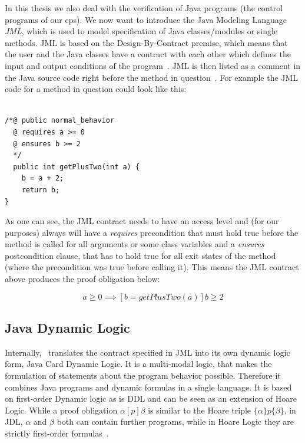 In this thesis we also deal with the verification of Java programs (the control programs of our cps). We now want to introduce the Java Modeling Language \textit{JML}, which is used to model specification of Java classes/modules or single methods. JML is based on the Design-By-Contract premise, which means that the user and the Java classes have a contract with each other which defines the input and output conditions of the program~\cite{keybook2007}. JML is then listed as a comment in the Java source code right before the method in question~\cite{fmcoKeYTutorial06}. For example the JML code for a method in question could look like this:


\begin{lstlisting}[label=lst:jml_example]

/*@ public normal_behavior
  @ requires a >= 0
  @ ensures b >= 2
  */
  public int getPlusTwo(int a) {
  	b = a + 2;
  	return b;
}

\end{lstlisting}

As one can see, the JML contract needs to have an access level and (for our purposes) always will have a \textit{requires} precondition that must hold true before the method is called for all arguments or some class variables and a \textit{ensures} postcondition clause, that has to hold true for all exit states of the method (where the precondition was true before calling it). This means the JML contract above produces the proof obligation below:

\begin{equation}
	a \geq 0 \implies [b = getPlusTwo(a) ] b \geq 2
	\label{eq:jmlddl}
\end{equation}

\subsection{Java Dynamic Logic}
\label{subsec:jdl}

Internally, \key~translates the contract specified in JML into its own dynamic logic form, Java Card Dynamic Logic. It is a multi-modal logic, that makes the formulation of statements about the program behavior possible. Therefore it combines Java programs and dynamic formulas in a single language. It is based on first-order Dynamic logic as is DDL and can be seen as an extension of Hoare Logic. While a proof obligation \(\alpha[p]\beta\) is similar to the Hoare triple \(\{\alpha\}p\{\beta\}\), in JDL, \(\alpha\) and \(\beta\) both can contain further programs, while in Hoare Logic they are strictly first-order formulas~\cite{keybook2007}.

